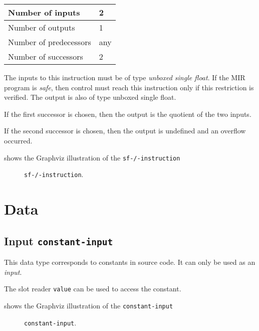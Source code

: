 \begin{tabular}{|l|l|}
\hline
Number of inputs & 2\\
\hline
Number of outputs & 1\\
\hline
Number of predecessors & any\\
\hline
Number of successors & 2\\
\hline
\end{tabular}

The inputs to this instruction must be of type \emph{unboxed single
  float}.  If the MIR program is \emph{safe}, then control must reach
this instruction only if this restriction is verified.  The output is
also of type unboxed single float.

If the first successor is chosen, then the output is
the quotient of the two inputs.  

If the second successor is chosen, then the output is undefined and an
overflow occurred. 

 shows the Graphviz illustration of the
\texttt{sf-/-instruction}

\begin{figure}
\begin{center}
\end{center}
\caption{\label{fig-sf-/-instruction}
\texttt{sf-/-instruction}.}
\end{figure}

\section{Data}

\subsection{Input \texttt{constant-input}}

This data type corresponds to constants in source code.  It can only
be used as an \emph{input}.

The slot reader \texttt{value} can be used to access the constant. 

 shows the Graphviz illustration of the
\texttt{constant-input}

\begin{figure}
\begin{center}
\end{center}
\caption{\label{fig-constant-input}
\texttt{constant-input}.}
\end{figure}


